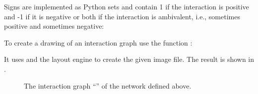 \documentclass[letterpaper,10pt,english]{sphinxmanual}
\begin{document}
\begin{sphinxVerbatim}[commandchars=\\\{\}]
\PYG{p}{[}\PYG{p}{]}\PYG{p}{[}\PYG{p}{]}\PYG{p}{[}\PYG{p}{]}
\end{sphinxVerbatim}

Signs are implemented as Python sets and contain 1 if the interaction is positive and -1 if it is negative or both if the interaction is ambivalent,
i.e., sometimes positive and sometimes negative:

\begin{sphinxVerbatim}[commandchars=\\\{\}]
\PYG{p}{[}\PYG{p}{]}\PYG{p}{[}\PYG{p}{]}\PYG{p}{[}\PYG{p}{]}
\end{sphinxVerbatim}

To create a drawing of an interaction graph use the function {\hyperref[\detokenize{InteractionGraphs:igraph2image}]{}}:

\begin{sphinxVerbatim}[commandchars=\\\{\}]
 
\end{sphinxVerbatim}

It uses {\hyperref[\detokenize{Installation:installation-graphviz}]{}} and the layout engine  to create the given image file.
The result is shown in {\hyperref[\detokenize{Manual:figure01}]{}}.

\begin{figure}[htbp]
\centering
\capstart

\noindent{}
\caption{The interaction graph “” of the network defined above.}\label{\detokenize{Manual:figure01}}\label{\detokenize{Manual:id6}}\end{figure}
\end{document}
